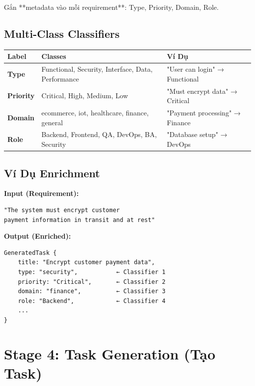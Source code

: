 \documentclass[12pt, a4paper]{report}
\begin{document}
Gắn **metadata vào mỗi requirement**: Type, Priority, Domain, Role.

\subsection{Multi-Class Classifiers}

\begin{table}[h]
\centering
\begin{tabular}{|p{2.5cm}|p{4cm}|p{3cm}|}
\hline
\textbf{Label} & \textbf{Classes} & \textbf{Ví Dụ} \\
\hline
\textbf{Type} & Functional, Security, Interface, Data, Performance & "User can login" → Functional \\
\hline
\textbf{Priority} & Critical, High, Medium, Low & "Must encrypt data" → Critical \\
\hline
\textbf{Domain} & ecommerce, iot, healthcare, finance, general & "Payment processing" → Finance \\
\hline
\textbf{Role} & Backend, Frontend, QA, DevOps, BA, Security & "Database setup" → DevOps \\
\hline
\end{tabular}
\end{table}

\subsection{Ví Dụ Enrichment}

\begin{tcolorbox}[colback=green!5]
\textbf{Input (Requirement):}
\begin{lstlisting}
"The system must encrypt customer 
payment information in transit and at rest"
\end{lstlisting}

\textbf{Output (Enriched):}
\begin{lstlisting}
GeneratedTask {
    title: "Encrypt customer payment data",
    type: "security",           ← Classifier 1
    priority: "Critical",       ← Classifier 2
    domain: "finance",          ← Classifier 3
    role: "Backend",            ← Classifier 4
    ...
}
\end{lstlisting}
\end{tcolorbox}

\section{Stage 4: Task Generation (Tạo Task)}
\end{document}
